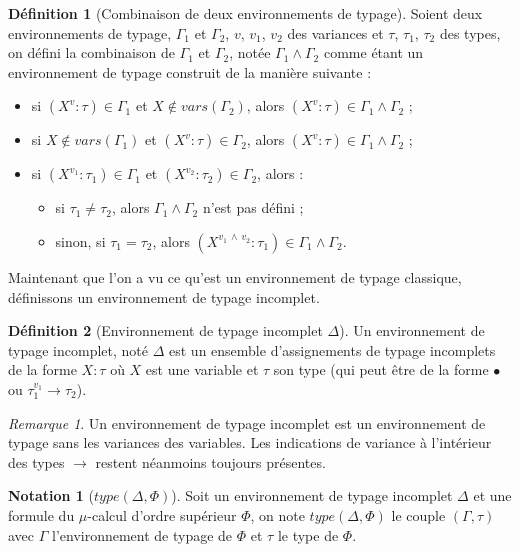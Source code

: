\documentclass{rapport}
\theoremstyle{plain}
\theoremstyle{remark}
\newtheorem{rema}{Remarque}
\theoremstyle{definition}
\newtheorem{notat}{Notation}
\newtheorem{dfn}{Définition}
\begin{document}
\begin{dfn} [Combinaison de deux environnements de typage] Soient deux environnements de typage, $\Gamma_1$ et $\Gamma_2$, $v$, $v_1$, $v_2$ des variances et $\tau$, $\tau_1$, $\tau_2$ des types, on défini la combinaison de $\Gamma_1$ et $\Gamma_2$, notée ${\Gamma_1 \wedge \Gamma_2}$ comme étant un environnement de typage construit de la manière suivante : 
\begin{itemize}
	\item si $(X^v : \tau) \in \Gamma_1$ et $X \notin vars(\Gamma_2)$, alors $(X^v : \tau) \in {\Gamma_1 \wedge \Gamma_2}$ ;
	\item si $X \notin vars(\Gamma_1)$ et $(X^v : \tau) \in \Gamma_2$, alors $(X^v : \tau) \in {\Gamma_1 \wedge \Gamma_2}$ ;
	\item si $(X^{v_1} : \tau_1) \in \Gamma_1$ et $(X^{v_2} : \tau_2) \in \Gamma_2$, alors : 
	\begin{itemize}
		\item si $\tau_1 \neq \tau_2$, alors ${\Gamma_1 \wedge \Gamma_2}$ n'est pas défini ;
		\item sinon, si $\tau_1 = \tau_2$, alors $(X^{v_1 \, \wedge \, v_2} : \tau_1) \in {\Gamma_1 \wedge \Gamma_2}$.
	\end{itemize}
\end{itemize}
\end{dfn}

Maintenant que l'on a vu ce qu'est un environnement de typage classique, définissons un environnement de typage incomplet.

\begin{dfn} [Environnement de typage incomplet $\Delta$] Un environnement de typage incomplet, noté $\Delta$ est un ensemble d'assignements de typage incomplets de la forme ${X : \tau}$ où $X$ est une variable et $\tau$ son type (qui peut être de la forme $\bullet$ ou ${\tau_1^{v_1} \rightarrow \tau_2}$).  
\end{dfn}

\begin{rema}
Un environnement de typage incomplet est un environnement de typage sans les variances des variables. Les indications de variance à l'intérieur des types $\rightarrow$ restent néanmoins toujours présentes. 
\end{rema}

\begin{notat} [$type(\Delta, \Phi)$] Soit un environnement de typage incomplet $\Delta$ et une formule du $\mu$-calcul d'ordre supérieur $\Phi$, on note $type(\Delta, \Phi)$ le couple $(\Gamma, \tau)$ avec $\Gamma$ l'environnement de typage de $\Phi$ et $\tau$ le type de $\Phi$.
\end{notat}
\end{document}
